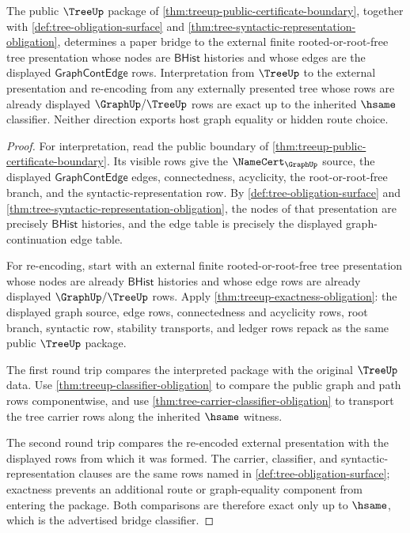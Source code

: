 \begin{theorem}
\label{thm:treeup-public-derivation-syntax-bridge}
The public $\TreeUp$ package of \autoref{thm:treeup-public-certificate-boundary}, together with \autoref{def:tree-obligation-surface} and \autoref{thm:tree-syntactic-representation-obligation}, determines a paper bridge to the external finite rooted-or-root-free tree presentation whose nodes are $\mathsf{BHist}$ histories and whose edges are the displayed $\mathsf{GraphContEdge}$ rows. Interpretation from $\TreeUp$ to the external presentation and re-encoding from any externally presented tree whose rows are already displayed $\GraphUp/\TreeUp$ rows are exact up to the inherited $\hsame$ classifier. Neither direction exports host graph equality or hidden route choice.
\end{theorem}
\begin{proof}
For interpretation, read the public boundary of \autoref{thm:treeup-public-certificate-boundary}. Its visible rows give the $\NameCert_{\GraphUp}$ source, the displayed $\mathsf{GraphContEdge}$ edges, connectedness, acyclicity, the root-or-root-free branch, and the syntactic-representation row. By \autoref{def:tree-obligation-surface} and \autoref{thm:tree-syntactic-representation-obligation}, the nodes of that presentation are precisely $\mathsf{BHist}$ histories, and the edge table is precisely the displayed graph-continuation edge table.

For re-encoding, start with an external finite rooted-or-root-free tree presentation whose nodes are already $\mathsf{BHist}$ histories and whose edge rows are already displayed $\GraphUp/\TreeUp$ rows. Apply \autoref{thm:treeup-exactness-obligation}: the displayed graph source, edge rows, connectedness and acyclicity rows, root branch, syntactic row, stability transports, and ledger rows repack as the same public $\TreeUp$ package.

The first round trip compares the interpreted package with the original $\TreeUp$ data. Use \autoref{thm:treeup-classifier-obligation} to compare the public graph and path rows componentwise, and use \autoref{thm:tree-carrier-classifier-obligation} to transport the tree carrier rows along the inherited $\hsame$ witness.

The second round trip compares the re-encoded external presentation with the displayed rows from which it was formed. The carrier, classifier, and syntactic-representation clauses are the same rows named in \autoref{def:tree-obligation-surface}; exactness prevents an additional route or graph-equality component from entering the package. Both comparisons are therefore exact only up to $\hsame$, which is the advertised bridge classifier.
\end{proof}

